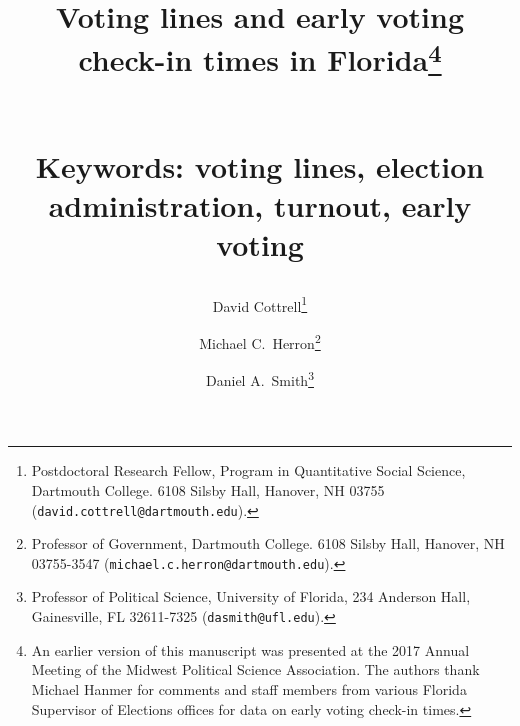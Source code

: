 \documentclass[12pt,titlepage]{article}
\providecommand{\keywords}[1]{\textbf{\normalsize{Keywords: }} \normalsize{#1}}
\begin{document}
\sloppy
\thispagestyle{empty}


\renewcommand{\topfraction}{.85}
\renewcommand{\bottomfraction}{.7}
\renewcommand{\textfraction}{.15}
\renewcommand{\floatpagefraction}{.66}
\renewcommand{\dbltopfraction}{.66}
\renewcommand{\dblfloatpagefraction}{.66}



\title{Voting lines and early voting check-in times in
  Florida\thanks{An earlier version of this manuscript was presented
    at the 2017 Annual Meeting of the Midwest Political Science
    Association.  The authors thank Michael Hanmer for comments and
    staff members from various Florida Supervisor of Elections offices
    for data on early voting check-in times.}\author{David
    Cottrell\thanks{Postdoctoral Research Fellow, Program in
      Quantitative Social Science, Dartmouth College.  6108 Silsby
      Hall, Hanover, NH 03755
      (\texttt{david.cottrell@dartmouth.edu}).} \and Michael C.\
    Herron\thanks{Professor of Government, Dartmouth College.  6108
      Silsby Hall, Hanover, NH 03755-3547
      (\texttt{michael.c.herron@dartmouth.edu}).} \and Daniel A.\
    Smith\thanks{Professor of Political Science, University of
      Florida, 234 Anderson Hall, Gainesville, FL 32611-7325
      (\texttt{dasmith@ufl.edu}).}}\vspace{1cm}\\\keywords{voting
    lines, election administration, turnout, early voting}}

\maketitle \doublespacing 



\end{document}
